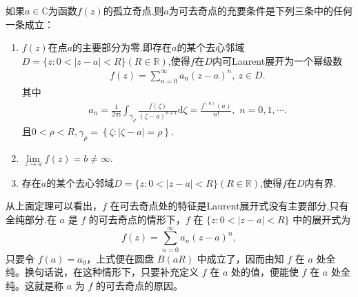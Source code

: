 \documentclass[../../main.tex]{subfiles}%
\begin{document}
\begin{theorem}[Riemann定理]\label{theorem:Riemann定理-定理5.2.1}
如果$a\in \mathbb{C}$为函数$f(z)$的孤立奇点,则$a$为可去奇点的充要条件是下列三条中的任何一条成立：
\begin{enumerate}[(1)]
\item $f(z)$在点$a$的主要部分为零.即存在$a$的某个去心邻域$D=\{z:0<|z-a|<R\}(R\in \mathbb{R})$,使得\( f \)在$D$内可Laurent展开为一个幂级数
\begin{align*}
f(z)=\sum_{n=0}^{\infty}{a_n\left( z-a \right) ^n},\ z\in D.
\end{align*}
其中
\begin{align*}
a_n=\frac{1}{2\pi \mathrm{i}}\int_{\gamma _{\rho}}{\frac{f\left( \zeta \right)}{\left( \zeta -a \right) ^{n+1}}\mathrm{d}\zeta}=\frac{f^{\left( n \right)}\left( a \right)}{n!},\,\,n=0,1,\cdots .
\end{align*}
且$0<\rho <R,\gamma _{\rho}=\left\{ \zeta :\left| \zeta -a\right|=\rho \right\} .$

\item $\lim\limits_{z \to a}f(z)=b\neq\infty$.

\item 存在$a$的某个去心邻域$D=\{z:0<|z-a|<R\}(R\in \mathbb{R})$,使得\( f \)在$D$内有界.
\end{enumerate}
\end{theorem}
\begin{remark}
从上面定理可以看出，\( f \) 在可去奇点处的特征是Laurent展开式没有主要部分,只有全纯部分.在 \( a\) 是 \( f \) 的可去奇点的情形下，\( f \) 在 \( \{ z: 0 < |z - a| < R \} \) 中的展开式为
\[
f(z) = \sum_{n = 0}^{\infty} a_n (z - a)^n,
\]
只要令 \( f(a) = a_0 \)，上式便在圆盘 \( B(a R) \) 中成立了，因而由知 \( f \) 在 \( a \) 处全纯。换句话说，在这种情形下，只要补充定义 \( f \) 在 \( a \) 处的值，便能使 \( f \) 在 \(a \) 处全纯。这就是称 \(a\) 为 \( f \) 的可去奇点的原因。
\end{remark}
\end{document}
